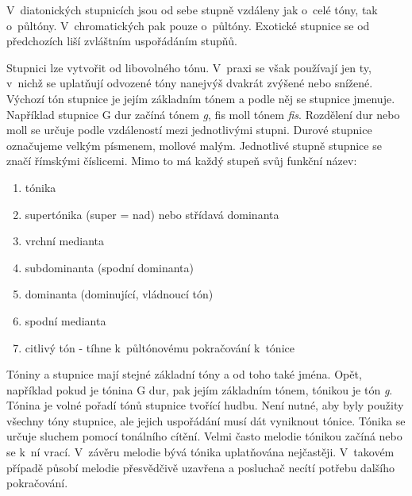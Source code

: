 V~diatonických stupnicích jsou od sebe stupně vzdáleny jak o~celé tóny, tak o~půltóny.
V~chromatických pak pouze o~půltóny.
Exotické stupnice se od předchozích liší zvláštním uspořádáním stupňů.
\cite{kofron}
\par

Stupnici lze vytvořit od libovolného tónu.
V~praxi se však používají jen ty, 
v~nichž se uplatňují odvozené tóny nanejvýš dvakrát zvýšené nebo snížené.
Výchozí tón stupnice je jejím základním tónem a podle něj se stupnice jmenuje.
Například stupnice G dur začíná tónem \emph{g}, fis moll tónem \emph{fis}.
Rozdělení dur nebo moll se určuje podle vzdáleností mezi jednotlivými stupni.
\cite{zenkl}
Durové stupnice označujeme velkým písmenem, mollové malým.
Jednotlivé stupně stupnice se značí římskými číslicemi.
Mimo to má každý stupeň svůj funkční název:
\cite{kofron}

\begin{enumerate} [label=\Roman*]
    \item tónika
    \item supertónika (super = nad) nebo střídavá dominanta
    \item vrchní medianta
    \item subdominanta (spodní dominanta)
    \item dominanta (dominující, vládnoucí tón)
    \item spodní medianta
    \item citlivý tón - tíhne k~půltónovému pokračování k~tónice
\end{enumerate}
\par

Tóniny a stupnice mají stejné základní tóny a od toho také jména.
Opět, například pokud je tónina G dur, pak jejím základním tónem, tónikou je tón \emph{g}.
Tónina je volné pořadí tónů stupnice tvořící hudbu.
Není nutné, aby byly použity všechny tóny stupnice, 
ale jejich uspořádání musí dát vyniknout tónice.
Tónika se určuje sluchem pomocí tonálního cítění.
Velmi často melodie tónikou začíná nebo se k~ní vrací.
V~závěru melodie bývá tónika uplatňována nejčastěji.
V~takovém případě působí melodie přesvědčivě uzavřena 
a posluchač necítí potřebu dalšího pokračování.
\cite{zenkl}
\par

